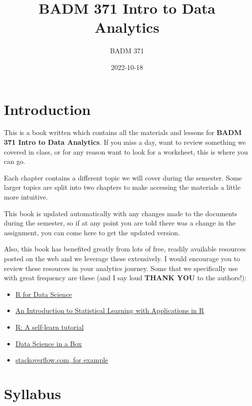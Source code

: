 \documentclass[
]{book}
\title{BADM 371 Intro to Data Analytics}
\author{BADM 371}
\date{2022-10-18}
\providecommand{\tightlist}{%
  \setlength{\itemsep}{0pt}\setlength{\parskip}{0pt}}
\begin{document}
\maketitle

{
\setcounter{tocdepth}{1}
\tableofcontents
}
\hypertarget{introduction}{%
\chapter{Introduction}\label{introduction}}

This is a book written which contains all the materials and lessons for \textbf{BADM 371 Intro to Data Analytics}. If you miss a day, want to review something we covered in class, or for any reason want to look for a worksheet, this is where you can go.

Each chapter contains a different topic we will cover during the semester. Some larger topics are split into two chapters to make accessing the materials a little more intuitive.

This book is updated automatically with any changes made to the documents during the semester, so if at any point you are told there was a change in the assignment, you can come here to get the updated version.

Also, this book has benefited greatly from lots of free, readily available resources posted on the web and we leverage these extensively. I would encourage you to review these resources in your analytics journey. Some that we specifically use with great frequency are these (and I say loud \textbf{THANK YOU} to the authors!):

\begin{itemize}
\tightlist
\item
  \href{https://r4ds.had.co.nz/}{R for Data Science}
\item
  \href{https://trevorhastie.github.io/ISLR/}{An Introduction to Statistical Learning with Applications in R}
\item
  \href{https://gsp.humboldt.edu/olm/R/Tutorials/BestFirstRTutorial.pdf}{R: A self-learn tutorial}
\item
  \href{https://datasciencebox.org/}{Data Science in a Box}
\item
  \href{https://stackoverflow.com/questions/4862178/remove-rows-with-all-or-some-nas-missing-values-in-data-frame?rq=1}{stackoverflow.com, for example}
\end{itemize}

\hypertarget{syllabus}{%
\chapter{Syllabus}\label{syllabus}}
\end{document}
